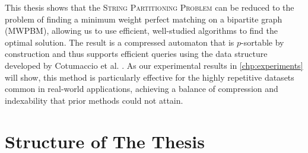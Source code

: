This thesis shows that the \textsc{String Partitioning Problem} can be reduced to the problem of finding a minimum weight perfect matching on a bipartite graph (MWPBM), allowing us to use efficient, well-studied algorithms to find the optimal solution. The result is a compressed automaton that is $p$-sortable by construction and thus supports efficient queries using the data structure developed by Cotumaccio et al. \cite{cotumaccio2023co}. As our experimental results in \cref{chp:experiments} will show, this method is particularly effective for the highly repetitive datasets common in real-world applications, achieving a balance of compression and indexability that prior methods could not attain.

\section{Structure of The Thesis}
